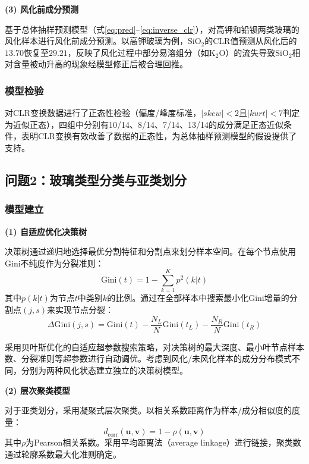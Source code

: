 \documentclass[12pt,a4paper]{ctexart}
\begin{document}
\textbf{(3) 风化前成分预测}

基于总体抽样预测模型（式\ref{eq:pred}--\ref{eq:inverse_clr}），对高钾和铅钡两类玻璃的风化样本进行风化前成分预测。以高钾玻璃为例，SiO$_2$的CLR值预测从风化后的$13.70$恢复至$29.21$，反映了风化过程中部分易溶组分（如K$_2$O）的流失导致SiO$_2$相对含量被动升高的现象经模型修正后被合理回推。

\subsubsection{模型检验}

对CLR变换数据进行了正态性检验（偏度/峰度标准，$|skew|<2$且$|kurt|<7$判定为近似正态），四组中分别有10/14、8/14、7/14、13/14的成分满足正态近似条件，表明CLR变换有效改善了数据的正态性，为总体抽样预测模型的假设提供了支持。

\newpage

\subsection{问题2：玻璃类型分类与亚类划分}

\subsubsection{模型建立}

\textbf{(1) 自适应优化决策树}

决策树通过递归地选择最优分割特征和分割点来划分样本空间\cite{6}。在每个节点使用Gini不纯度作为分裂准则：
\begin{equation}
    \text{Gini}(t)=1-\sum_{k=1}^{K}p^2(k|t)
    \label{eq:gini}
\end{equation}
其中$p(k|t)$为节点$t$中类别$k$的比例。通过在全部样本中搜索最小化Gini增量的分割点$(j,s)$来实现节点分裂：
\begin{equation}
    \Delta\text{Gini}(j,s)=\text{Gini}(t)-\frac{N_L}{N}\text{Gini}(t_L)-\frac{N_R}{N}\text{Gini}(t_R)
    \label{eq:gini_split}
\end{equation}

采用贝叶斯优化的自适应超参数搜索策略\cite{7}，对决策树的最大深度、最小叶节点样本数、分裂准则等超参数进行自动调优。考虑到风化/未风化样本的成分分布模式不同，分别为两种风化状态建立独立的决策树模型。

\textbf{(2) 层次聚类模型}

对于亚类划分，采用凝聚式层次聚类。以相关系数距离作为样本/成分相似度的度量：
\begin{equation}
    d_{\text{corr}}(\mathbf{u},\mathbf{v})=1-\rho(\mathbf{u},\mathbf{v})
    \label{eq:corr_dist}
\end{equation}
其中$\rho$为Pearson相关系数。采用平均距离法（average linkage）进行链接，聚类数通过轮廓系数最大化准则确定\cite{8}。
\end{document}
